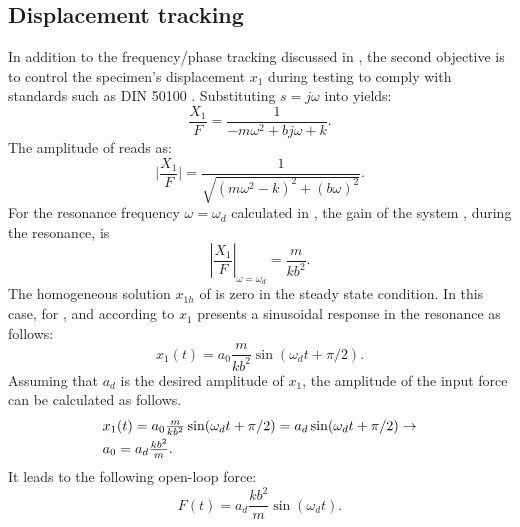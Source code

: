 \documentclass[lettersize,journal]{IEEEtran}
\begin{document}
\subsection{Displacement tracking} \label{S_amplitude_tracking}

In addition to the frequency/phase tracking discussed in , the second objective is to control the specimen's displacement $x_1$ during testing to comply with standards such as DIN 50100 \cite{DIN_standard}. Substituting $s = j\omega$ into  yields:
\begin{equation}
\frac{X_1}{F}=\frac{1}{-m\omega^2+bj\omega+k} .
\label{E_Laplace_frequency}
\end{equation}
The amplitude of  reads as:
\begin{equation}
\big|\frac{X_1}{F}\big|=\frac{1}{\sqrt{(m\omega^2-k)^2+(b\omega)^2}}.
\label{E_Laplace_frequency_mag}
\end{equation}
For the resonance frequency $\omega=\omega_d$ calculated in , the gain of the system , during the resonance, is
\begin{equation}
|\frac{X_1}{F}|_{\omega=\omega_d}=\frac{m}{kb^2}.
\label{E_Laplace_frequency_mag_resonance}
\end{equation}
The homogeneous solution $x_{1h}$ of  is zero in the steady state condition. In this case, for , and according to  $x_1$ presents a sinusoidal response in the resonance as follows:
\begin{equation}
x_1(t)=a_0 \frac{m}{kb^2} \sin(\omega_d t+\pi/2).
\label{E_x_1_steady_amplitude}
\end{equation}
Assuming that $a_d$ is the desired amplitude of $x_1$, the amplitude of the input force can be calculated as follows.
\begin{equation}
\begin{array}{l}
x_1(t)=a_0 \frac{m}{kb^2} \sin(\omega_d t+\pi/2) = a_d  \sin(\omega_d t+\pi/2) \rightarrow \vspace{0.1cm} \\ 
a_0=a_d \frac{kb^2}{m}. 
\end{array}
\label{E_x_1_steady_a0}
\end{equation}
It leads to the following open-loop force:
\begin{equation}
F(t)=a_d \frac{kb^2}{m} \sin(\omega_dt). 
\label{E_x_1_open_loop_force}
\end{equation}
\end{document}
